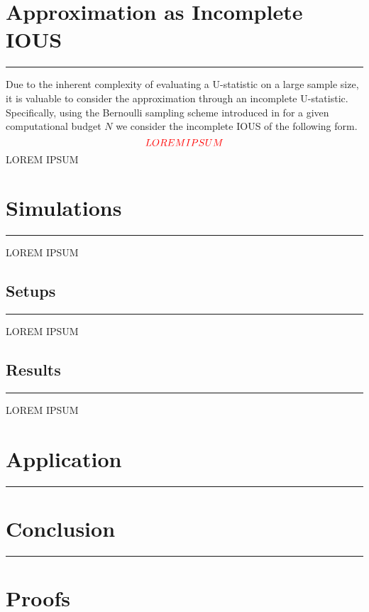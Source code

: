 \documentclass[letterpaper,10pt]{article}
\numberwithin{equation}{section}
\numberwithin{theorem}{section}
\theoremstyle{definition}
\newcommand{\1}{\mathbb{1}}
\begin{document}
\section{Approximation  as Incomplete IOUS}
\hrule

Due to the inherent complexity of evaluating a U-statistic on a large sample size, it is valuable to consider the approximation through an incomplete U-statistic.
Specifically, using the Bernoulli sampling scheme introduced in \citet{chen_randomized_2019} for a given computational budget $N$ we consider the incomplete IOUS of the following form.
\begin{equation}
	{\color{red} LOREM IPSUM}
\end{equation}
{\color{red} LOREM IPSUM}

\section{Simulations}\label{Simulations}
\hrule

{\color{red} LOREM IPSUM}

\subsection*{Setups}
\hrule

{\color{red} LOREM IPSUM}

\subsection*{Results}
\hrule

{\color{red} LOREM IPSUM}

\section{Application}\label{Application}
\hrule

\section{Conclusion}\label{Conclusion}
\hrule

\newpage
\printbibliography

\appendix
\section{Proofs}

\end{document}
